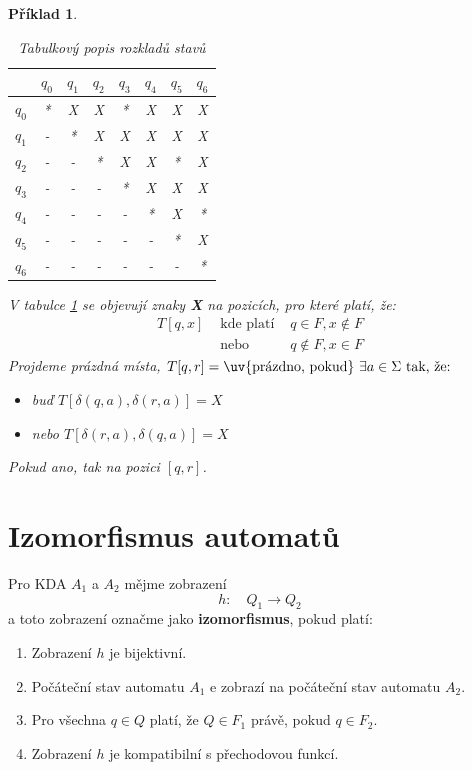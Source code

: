 \documentclass[10pt, a4paper, titlepage]{article}
\theoremstyle{note}
\newtheorem{priklad}{\textbf{Příklad}}
\begin{document}
\begin{priklad}
\begin{center}
\vspace*{30px}
\begin{table}[h]
\begin{center}
\begin{tabular}{c||c|c|c|c|c|c|c}
& $q_0$ & $q_1$ & $q_2$ & $q_3$ & $q_4$ & $q_5$ & $q_6$ \\
\hline
$q_0$ & * & X & X & * & X & X & X \\
\hline
$q_1$ & - & * & X & X & X & X & X \\
\hline
$q_2$ & - & - & * & X & X & * & X \\
\hline
$q_3$ & - & - & - & * & X & X & X \\
\hline
$q_4$ & - & - & - & - & * & X & * \\
\hline
$q_5$ & - & - & - & - & - & * & X \\
\hline
$q_6$ & - & - & - & - & - & - & * \\
\end{tabular}
\end{center}
\caption{Tabulkový popis rozkladů stavů}\label{tabulka-x}
\end{table}
\end{center}
V tabulce \ref{tabulka-x} se objevují znaky \textbf{X} na pozicích, pro které platí, že:
\begin{eqnarray*}
T[q,x] &\text{ kde platí }& q \in F, x \notin F \\
&\text{ nebo }& q \notin F, x \in F
\end{eqnarray*}
Projdeme pr\'azdn\'a m\'ista, $T[q,r] = \text{\uv{pr\'azdno, pokud} } \exists a \in \Sigma \text{ tak, že:}$
\begin{itemize}
\item
buď $T[\delta(q,a),\delta(r,a)] = X$
\item
nebo $T[\delta(r,a),\delta(q,a)] = X$
\end{itemize}
Pokud ano, tak  na pozici $[q,r]$.
\end{priklad}

\section{Izomorfismus automatů}
Pro KDA $A_1$ a $A_2$ mějme zobrazen\'i
$$
h: \quad Q_1 \rightarrow Q_2
$$
a toto zobrazení označme jako \textbf{izomorfismus}, pokud platí:
\begin{enumerate}
\item
Zobrazení $h$ je bijektivní.
\item
Počáteční stav automatu $A_1$ e zobrazí na počáteční stav automatu $A_2$.
\item
Pro všechna $q \in Q$ platí, že $Q \in F_1$ právě, pokud $q \in F_2$.
\item
Zobrazení $h$ je kompatibilní s přechodovou funkcí.
\end{enumerate}
\end{document}

